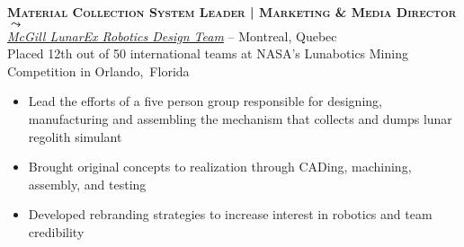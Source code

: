 \documentclass[11pt, letterpaper]{article}
\newcommand{\years}[1]{\marginnote{\footnotesize #1}} %
\begin{document}


  \begin{samepage}
    \years{8/2012 - 8/2013} \textbf{\scshape Material Collection System Leader | Marketing \& Media Director \href{http://www.michaelelliotking.com/projects/lunarex}{$\leadsto$}}\\
    \href{http://www.lunarex.mcgill.ca}{\textit{McGill LunarEx Robotics Design Team}} -- Montreal, Quebec\\
    {\small Placed 12th out of 50 international teams at NASA's Lunabotics Mining Competition in Orlando,~Florida}
    \begin{itemize}
      \item Lead the efforts of a five person group responsible for designing, manufacturing and assembling the mechanism that collects and dumps lunar regolith simulant
      \item Brought original concepts to realization through CADing, machining, assembly, and testing
      \item Developed rebranding strategies to increase interest in robotics and team credibility
    \end{itemize}
  \end{samepage}
\end{document}
